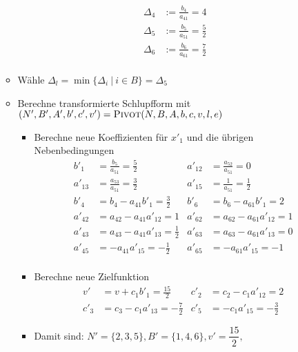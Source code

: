 \documentclass[a4paper,10pt]{article}
\begin{document}
\begin{enumerate}
\begin{itemize}
                \begin{align*}
                    \Delta_4 &:= \frac{b_4}{a_{41}} = 4 \\
                    \Delta_5 &:= \frac{b_5}{a_{51}} = \frac{5}{2} \\
                    \Delta_6 &:= \frac{b_6}{a_{61}} = \frac{7}{2} \\
                \end{align*}
        \item   Wähle $\Delta_l = \min\{\Delta_i\ |\ i \in B\} = \Delta_5$
        \item   Berechne transformierte Schlupfform mit $(N',B',A',b',c',v') = \textsc{Pivot}(N,B,A,b,c,v,l,e)$
                \begin{itemize}
                \item   Berechne neue Koeffizienten für $x'_1$ und die übrigen Nebenbedingungen
                \begin{align*}
                    b'_1    &= \frac{b_5}{a_{51}} = \frac{5}{2}    & a'_{12} &= \frac{a_{52}}{a_{51}} = 0 \\
                    a'_{13} &= \frac{a_{53}}{a_{51}} = \frac{3}{2} & a'_{15} &= \frac{1}{a_{51}} = \frac{1}{2} \\
                    \hline
                    b'_4    &= b_4 - a_{41}b'_1 = \frac{3}{2}      & b'_6    &= b_6 - a_{61}b'_1 = 2 \\
                    a'_{42} &= a_{42} - a_{41}a'_{12} = 1          & a'_{62} &= a_{62} - a_{61}a'_{12} = 1 \\
                    a'_{43} &= a_{43} - a_{41}a'_{13} = \frac{1}{2}& a'_{63} &= a_{63} - a_{61}a'_{13} = 0 \\
                    a'_{45} &= -a_{41}a'_{15} = -\frac{1}{2}       & a'_{65} &= -a_{61}a'_{15} = -1        \\
                \end{align*}
                \item   Berechne neue Zielfunktion
                \begin{align*}
                    v'   &= v + c_1b'_{1} = \frac{15}{2}             & c'_2 &= c_2 - c_1a'_{12} = 2 \\
                    c'_3 &= c_3 - c_1a'_{13} = -\frac{7}{2}          & c'_5 &= -c_1a'_{15} = -\frac{3}{2}
                \end{align*}
                \item   Damit sind:
                        $N' = \{2,3,5\}, B' = \{1,4,6\}, v' = \dfrac{15}{2},$

\end{itemize}
\end{itemize}
\end{enumerate}
\end{document}

